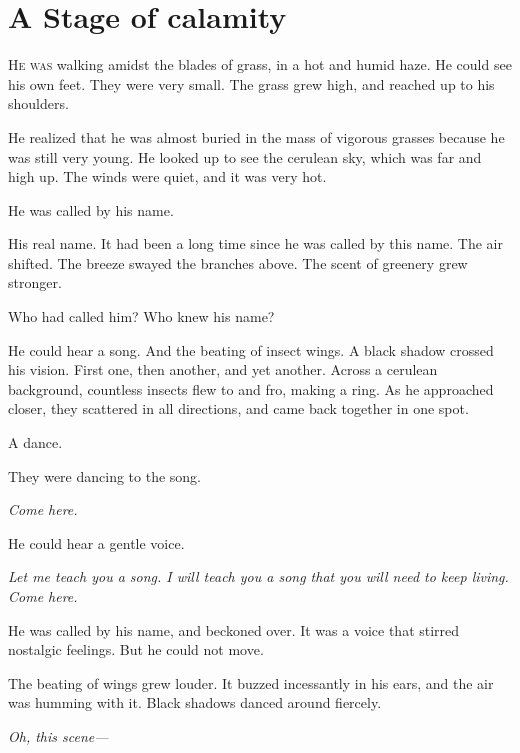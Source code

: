 
\chapter{A Stage of calamity}


\lettrine{H}{e was} walking amidst the blades of grass, in a hot and humid haze. He
could see his own feet. They were very small. The grass grew high, and
reached up to his shoulders.

He realized that he was almost buried in the mass of vigorous grasses
because he was still very young. He looked up to see the cerulean sky,
which was far and high up. The winds were quiet, and it was very hot.~

He was called by his name.

His real name. It had been a long time since he was called by this name.
The air shifted. The breeze swayed the branches above. The scent of
greenery grew stronger.

Who had called him? Who knew his name?

He could hear a song. And the beating of insect wings. A black shadow
crossed his vision. First one, then another, and yet another. Across a
cerulean background, countless insects flew to and fro, making a ring.
As he approached closer, they scattered in all directions, and came back
together in one spot.

A dance.

They were dancing to the song.

\emph{Come here.}

He could hear a gentle voice.

\emph{Let me teach you a song. I will teach you a song that you will need to
keep living. Come here.}

He was called by his name, and beckoned over. It was a voice that
stirred nostalgic feelings. But he could not move.

The beating of wings grew louder. It buzzed incessantly in his ears, and
the air was humming with it. Black shadows danced around fiercely.

\emph{Oh, this scene---}

